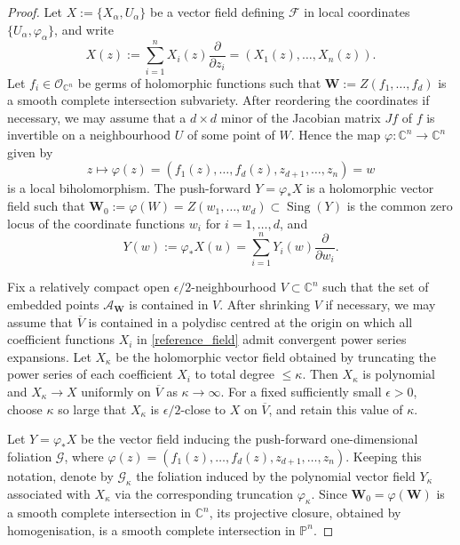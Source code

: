 \documentclass[10pt,a4paper]{amsart}
\DeclareMathOperator{\sing}{Sing}
\newcommand{\C}{\mathbb{C}}
\newcommand{\F}{\mathcal{F}}
\newcommand{\W}{\mathbf{W}}
\newcommand{\oo}{\mathcal{O}}
\begin{document}
\begin{proof}
Let $X:=\{X_\alpha,U_\alpha\}$ be a vector field defining $\F$ in local coordinates $\{U_\alpha,\varphi_\alpha\}$, and write
\begin{equation}\label{reference_field}
X(z):=\sum_{i=1}^n X_i(z)\frac{\partial}{\partial z_i}=(X_1(z),\ldots,X_n(z)).
\end{equation}
Let $f_i\in \oo_{\C^n}$ be germs of holomorphic functions such that
$\W:=Z(f_1,\ldots,f_d)$ is a smooth complete intersection subvariety.
After reordering the coordinates if necessary, we may assume that a $d\times d$ minor of the Jacobian matrix $Jf$ of $f$
is invertible on a neighbourhood $U$ of some point of $W$.
Hence the map $\varphi:\C^n\to\C^n$ given by
\[
z\longmapsto \varphi(z)=(f_1(z),\ldots,f_d(z),z_{d+1},\ldots,z_n)=w
\]
is a local biholomorphism.
The push-forward $Y=\varphi_*X$ is a holomorphic vector field such that
$\W_0:=\varphi(W)=Z(w_1,\ldots,w_d)\subset\sing(Y)$ is the common zero locus of the coordinate functions $w_i$ for $i=1,\ldots,d$, and
\begin{equation}\label{eq:push-forward-field}
Y(w):=\varphi_*X(u)=\sum_{i=1}^n Y_i(w)\frac{\partial}{\partial w_i}.
\end{equation}

Fix a relatively compact open $\epsilon/2$-neighbourhood $V\subset\C^n$ such that the set of embedded points $\mathcal{A}_{\W}$
is contained in $V$.
After shrinking $V$ if necessary, we may assume that $\overline V$ is contained in a polydisc centred at the origin on which all coefficient functions $X_i$
in \eqref{reference_field} admit convergent power series expansions.
Let $X_\kappa$ be the holomorphic vector field obtained by truncating the power series of each coefficient $X_i$ to total degree $\leq \kappa$.
Then $X_\kappa$ is polynomial and $X_\kappa\to X$ uniformly on $\overline V$ as $\kappa\to\infty$.
For a fixed sufficiently small $\epsilon>0$, choose $\kappa$ so large that $X_\kappa$ is $\epsilon/2$-close to $X$ on $\overline V$, and retain this value of $\kappa$.

Let $Y=\varphi_*X$ be the vector field inducing the push-forward one-dimensional foliation $\mathcal{G}$, where
$\varphi(z)=(f_1(z),\ldots,f_d(z),z_{d+1},\ldots,z_n)$.
Keeping this notation, denote by $\mathcal{G}_\kappa$ the foliation induced by the polynomial vector field $Y_\kappa$
associated with $X_\kappa$ via the corresponding truncation $\varphi_\kappa$.
Since $\W_0=\varphi(\W)$ is a smooth complete intersection in $\C^n$, its projective closure, obtained by homogenisation, is a smooth complete intersection in $\mathbb P^n$.


\end{proof}
\end{document}
